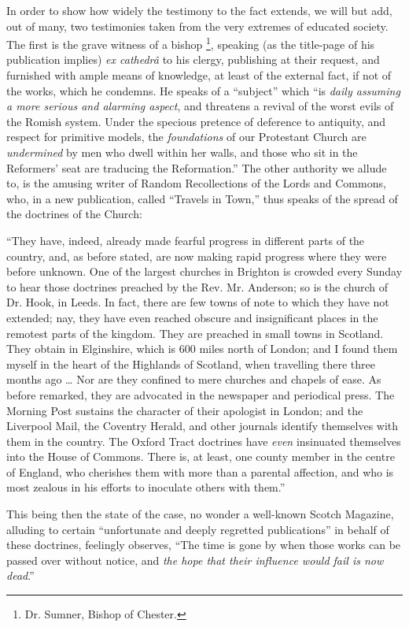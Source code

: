 In order to show how widely the testimony to the
fact extends, we will but add, out of many, two testimonies taken from
the very extremes of educated society. The first is the grave witness
of a bishop \footnote{Dr. Sumner, Bishop of Chester.}, speaking (as
the title-page of his publication implies) \emph{ex cathedrâ} to his
clergy, publishing at their request, and furnished with ample means of
knowledge, at least of the external fact, if not of the works, which
he condemns. He speaks of a ``subject'' which ``is \emph{daily assuming a
more serious and alarming aspect}, and threatens a revival of the
worst evils of the Romish system. Under the specious pretence of
deference to antiquity, and respect for primitive models, the \emph{foundations}
of our Protestant Church are \emph{undermined} by men who dwell within her
walls, and those who sit in the Reformers' seat are traducing the
Reformation.'' The other authority we allude to, is the amusing writer
of Random Recollections of the Lords and Commons, who, in a new
publication, called ``Travels in Town,'' thus speaks of the spread of
the doctrines of the Church:

``They
have, indeed, already made fearful progress in different parts of the
country, and, as before stated, are now making rapid progress where
they were before unknown. One of the largest churches in Brighton is
crowded every Sunday to hear those doctrines preached by the Rev. Mr.
Anderson; so is the church of Dr. Hook, in Leeds. In fact, there are
few towns of note to which they have not extended; nay, they have even
reached obscure and insignificant places in the remotest parts of the
kingdom. They are preached in small towns in Scotland. They obtain in
Elginshire, which is 600 miles north of London; and I found them
myself in the heart of the Highlands of Scotland, when travelling
there three months ago … Nor are they confined to
mere churches and chapels of ease. As before remarked, they are
advocated in the newspaper and periodical press. The Morning Post
sustains the character of their apologist in London; and the Liverpool
Mail, the Coventry Herald, and other journals identify themselves with
them in the country. The Oxford Tract doctrines have \emph{even}
insinuated themselves into the House of Commons. There is, at least,
one county member in the centre of England, who cherishes them with
more than a parental affection, and who is most zealous in his efforts
to inoculate others with them.''

This being then the state of the case, no wonder
a well-known Scotch Magazine, alluding to certain ``unfortunate and
deeply regretted publications'' in behalf of these doctrines, feelingly
observes, ``The time is gone by when those works can be passed over
without notice, and \emph{the hope that their influence would fail is now
dead}.''

